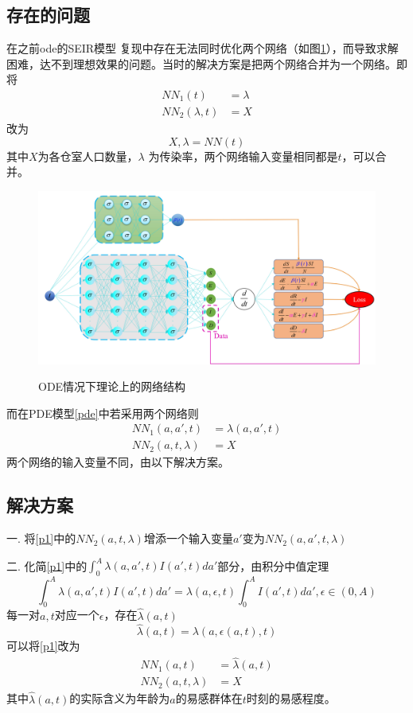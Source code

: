 \documentclass{article}
\numberwithin{figure}{section}
\numberwithin{equation}{section}
\numberwithin{table}{section}
\begin{document}
\subsection{存在的问题}
在之前ode的SEIR模型\cite{he2023transmission} 复现中存在无法同时优化两个网络（如图\ref{ode-nn}），而导致求解困难，达不到理想效果的问题。当时的解决方案是把两个网络合并为一个网络。即将
\begin{equation}
\begin{aligned}
NN_1(t)&=\lambda\\
NN_2(\lambda,t)&=X
\end{aligned}
\end{equation}
改为
\begin{equation}
    X,\lambda=NN(t)
\end{equation}
其中$X$为各仓室人口数量，$\lambda$ 为传染率，两个网络输入变量相同都是$t$，可以合并。
\begin{figure}[htbp]
    \centering
    \includegraphics[width=0.8\linewidth]{img/seir.png}\label{ode-nn}
    \caption{ODE情况下理论上的网络结构}
\end{figure}
而在PDE模型\eqref{pde}中若采用两个网络则
\begin{equation}
\begin{aligned}\label{p1}
    NN_1(a,a',t)&=\lambda(a,a',t)\\
    NN_2(a,t,\lambda)&=X
\end{aligned}
\end{equation}
两个网络的输入变量不同，由以下解决方案。
\subsection{解决方案}\label{Solution}
一. 将\eqref{p1}中的$NN_2(a,t,\lambda)$增添一个输入变量$a'$变为$NN_2(a,a',t,\lambda)$

二. 化简\eqref{p1}中的$\int_{0}^{A} \lambda(a,a',t)I(a',t)da'$部分，由积分中值定理
\begin{equation}
    \int_{0}^{A} \lambda(a,a',t)I(a',t)da'=\lambda(a,\epsilon,t)\int_{0}^{A} I(a',t)da',\epsilon \in (0,A)
\end{equation}
每一对$a,t$对应一个$\epsilon$，存在$\hat{\lambda}(a,t)$
\begin{equation}
    \hat{\lambda}(a,t)=\lambda(a,\epsilon(a,t),t)
\end{equation}
可以将\eqref{p1}改为
\begin{equation}
\begin{aligned}
    NN_1(a,t)&=\hat{\lambda}(a,t)\\
    NN_2(a,t,\lambda)&=X
\end{aligned}
\end{equation}
其中$\hat{\lambda}(a,t)$的实际含义为年龄为$a$的易感群体在$t$时刻的易感程度。
\end{document}
